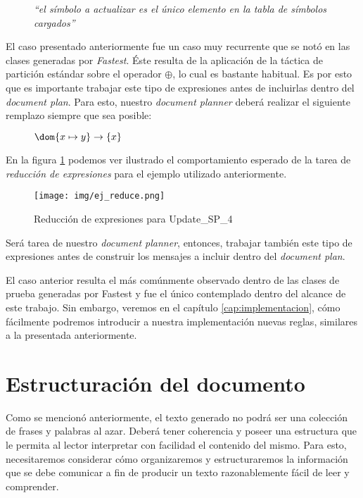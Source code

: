 \begin{figure}[H]
  \emph{``el símbolo a actualizar es el único elemento en la tabla de símbolos cargados''}
\end{figure}

El caso presentado anteriormente fue un caso muy recurrente que se notó en las clases generadas por \emph{Fastest}. Éste resulta de la aplicación de la táctica de partición estándar sobre el operador $\oplus$, lo cual es bastante habitual. Es por esto que es importante trabajar este tipo de expresiones antes de incluirlas dentro del \emph{document plan}. Para esto, nuestro \emph{document planner} deberá realizar el siguiente remplazo siempre que sea posible:

\begin{figure}[H]
  \centering
  $\dom \{ x \mapsto y \} \rightarrow \{x\}$ 
\end{figure}

En la figura \ref{fig:ej_reduce} podemos ver ilustrado el comportamiento esperado de la tarea de \emph{reducción de expresiones} para el ejemplo utilizado anteriormente.

\begin{figure}[H]
  	\centering
	\texttt{[image: img/ej\_reduce.png]}
	\caption{Reducción de expresiones para Update\_SP\_4}
  	\label{fig:ej_reduce}
\end{figure}


Será tarea de nuestro \textit{document planner}, entonces, trabajar también este tipo de expresiones antes de construir los mensajes a incluir dentro del \emph{document plan}. 

El caso anterior resulta el más comúnmente observado dentro de las clases de prueba generadas por Fastest y fue el único contemplado dentro del alcance de este trabajo. Sin embargo, veremos en el capítulo \ref{cap:implementacion}, cómo fácilmente podremos introducir a nuestra implementación nuevas reglas, similares a la presentada anteriormente.

\section{Estructuración del documento}
\label{sec:document_structure}

Como se mencionó anteriormente, el texto generado no podrá ser una colección de frases y palabras al azar. Deberá tener coherencia y poseer una estructura que le permita al lector interpretar con facilidad el contenido del mismo. Para esto, necesitaremos considerar cómo organizaremos y estructuraremos la información que se debe comunicar a fin de producir un texto razonablemente fácil de leer y comprender.

